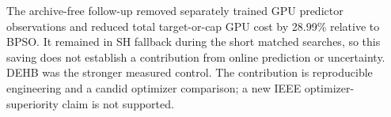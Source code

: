 The archive-free follow-up removed separately trained GPU predictor observations and reduced total target-or-cap GPU cost by 28.99\% relative to BPSO. It remained in SH fallback during the short matched searches, so this saving does not establish a contribution from online prediction or uncertainty. DEHB was the stronger measured control. The contribution is reproducible engineering and a candid optimizer comparison; a new IEEE optimizer-superiority claim is not supported.



